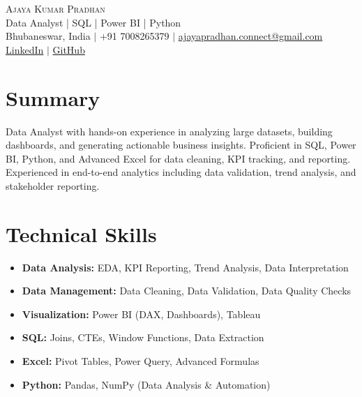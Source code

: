 \documentclass[letterpaper,11pt]{article}
\begin{document}
\begin{center}
    {\Huge \scshape Ajaya Kumar Pradhan} \\ \vspace{5pt}
    \small Data Analyst | SQL | Power BI | Python \\ \vspace{5pt}
    \small Bhubaneswar, India $|$ +91 7008265379 $|$ \href{mailto:ajayapradhan.connect@gmail.com}{ajayapradhan.connect@gmail.com} \\
    \href{https://linkedin.com}{LinkedIn} $|$ \href{https://github.com}{GitHub}
\end{center}

\section{Summary}
Data Analyst with hands-on experience in analyzing large datasets, building dashboards, and generating actionable business insights. Proficient in SQL, Power BI, Python, and Advanced Excel for data cleaning, KPI tracking, and reporting. Experienced in end-to-end analytics including data validation, trend analysis, and stakeholder reporting.

\section{Technical Skills}
\begin{itemize}[leftmargin=*]
\item \textbf{Data Analysis:} EDA, KPI Reporting, Trend Analysis, Data Interpretation
\item \textbf{Data Management:} Data Cleaning, Data Validation, Data Quality Checks
\item \textbf{Visualization:} Power BI (DAX, Dashboards), Tableau
\item \textbf{SQL:} Joins, CTEs, Window Functions, Data Extraction
\item \textbf{Excel:} Pivot Tables, Power Query, Advanced Formulas
\item \textbf{Python:} Pandas, NumPy (Data Analysis \& Automation)
\end{itemize}

\end{document}
